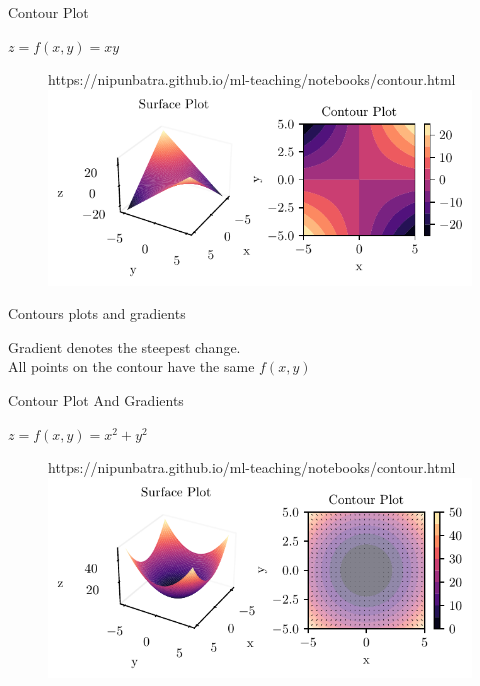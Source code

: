 \documentclass{beamer}
\begin{document}
\begin{frame}{Contour Plot}

$z = f(x,y) = xy$\\

\begin{figure}[htp]
	\centering
	\begin{notebookbox}{https://nipunbatra.github.io/ml-teaching/notebooks/contour.html}
	  \includegraphics[width=\linewidth]{../assets/mathematical-ml/figures/contour-x_times_y.pdf}
	\end{notebookbox}
  \end{figure}

\end{frame}

\begin{frame}{Contours plots and gradients}

    Gradient denotes the steepest change.\\
    All points on the contour have the same $f(x,y)$\\

\end{frame}

\begin{frame}{Contour Plot And Gradients}

$z = f(x,y) = x^{2} + y^{2}$\\

\begin{figure}[htp]
	\centering
	\begin{notebookbox}{https://nipunbatra.github.io/ml-teaching/notebooks/contour.html}
	  \includegraphics[width=\linewidth]{../assets/mathematical-ml/figures/contour-x_squared_plus_y_squared-with-gradient.pdf}
	\end{notebookbox}
  \end{figure}

\end{frame}
\end{document}
